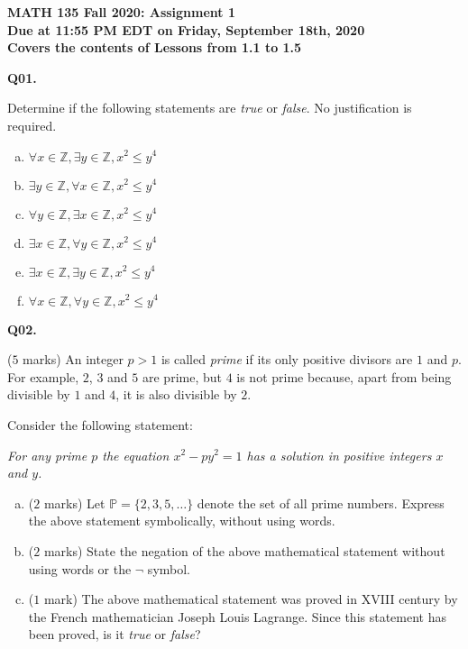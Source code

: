 \documentclass[11pt]{article}
\begin{document}
\parindent=0pt

\textbf{MATH 135 Fall 2020: Assignment 1\\Due at 11:55 PM EDT on Friday, September 18th, 2020\\Covers the contents of Lessons from 1.1 to 1.5}

\textbf{Q01.}

Determine if the following statements are \emph{true} or \emph{false}. No justification is required.

\begin{enumerate}[(a)]
\item $\forall x \in \mathbb Z, \exists y \in \mathbb Z, x^2 \leq y^4$

\item $\exists y \in \mathbb Z, \forall x \in \mathbb Z, x^2 \leq y^4$

\item $\forall y \in \mathbb Z, \exists x \in \mathbb Z, x^2 \leq y^4$

\item $\exists x \in \mathbb Z, \forall y \in \mathbb Z, x^2 \leq y^4$

\item $\exists x \in \mathbb Z, \exists y \in \mathbb Z, x^2 \leq y^4$

\item $\forall x \in \mathbb Z, \forall y \in \mathbb Z, x^2 \leq y^4$
\end{enumerate}





\textbf{Q02.}

($5$ marks) An integer $p > 1$ is called \emph{prime} if its only positive divisors are $1$ and $p$. For example, $2$, $3$ and $5$ are prime, but $4$ is not prime because, apart from being divisible by $1$ and $4$, it is also divisible by $2$.

Consider the following statement:
%
\begin{center}
\emph{For any prime $p$ the equation $x^2 - py^2 = 1$ has a solution in positive integers $x$ and $y$.}
\end{center}

\begin{enumerate}[(a)]
\item ($2$ marks) Let $\mathbb P = \{2, 3, 5, \ldots\}$ denote the set of all prime numbers. Express the above statement symbolically, without using words.

\item ($2$ marks) State the negation of the above mathematical statement without using words or the $\neg$ symbol.

\item ($1$ mark) The above mathematical statement was proved in XVIII century by the French mathematician Joseph Louis Lagrange. Since this statement has been proved, is it \emph{true} or \emph{false}?
\end{enumerate}
\end{document}
